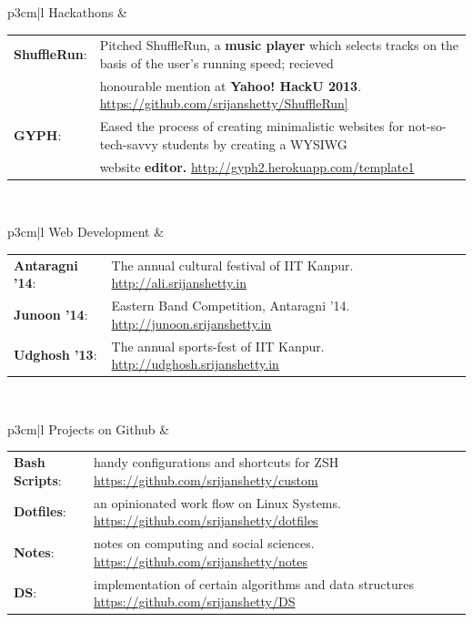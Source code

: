 \documentclass[a4paper]{article} %
\newcommand{\projectlist}[2]{
    \vspace{0.2cm}
    \begin{tabular}{p{3cm}|l}
        \textcolor{NavyBlue}{\small #1} & \footnotesize{#2}\\
    \end{tabular}
}
\begin{document}
\projectlist
    {Hackathons}
    {
        \begin{tabular}{p{2cm}l}
            \textbf{ShuffleRun}:
            & Pitched ShuffleRun, a \textbf{music player} which selects tracks on the basis of the user's
            running speed; recieved \\
            & honourable mention at \textbf{Yahoo! HackU 2013}.
            \href{https://github.com/srijanshetty/ShuffleRun} {https://github.com/srijanshetty/ShuffleRun]}\\

            \textbf{GYPH}:
            & Eased the process of creating minimalistic websites for not-so-tech-savvy students
            by creating a WYSIWG \\
            & website \textbf{editor.} \href{http://gyph2.herokuapp.com/template1} {http://gyph2.herokuapp.com/template1}
         \end{tabular}
     }

\projectlist
    {Web Development}
    {
        \begin{tabular}{p{2cm}l}
             \textbf{Antaragni '14}: & The annual cultural festival of IIT Kanpur.
             \href{http://ali.srijanshetty.in} {http://ali.srijanshetty.in}\\
             \textbf{Junoon '14}: & Eastern Band Competition, Antaragni '14.
             \href{http://junoon.srijanshetty.in}{http://junoon.srijanshetty.in}\\
            \textbf{Udghosh '13}: & The annual sports-fest of IIT Kanpur.
             \href{http://udghosh.srijanshetty.in}{http://udghosh.srijanshetty.in}\\
         \end{tabular}
    }

\projectlist
    {Projects on Github}
    {
        \begin{tabular}{p{2cm}l}
             \textbf{Bash Scripts}: & handy configurations and shortcuts for ZSH
             \href{https://github.com/srijanshetty/custom} {https://github.com/srijanshetty/custom}\\
             \textbf{Dotfiles}: & an opinionated work flow on Linux Systems.
             \href{https://github.com/srijanshetty/dotfiles} {https://github.com/srijanshetty/dotfiles}\\
             \textbf{Notes}: & notes on computing and social sciences.
             \href{https://github.com/srijanshetty/notes} {https://github.com/srijanshetty/notes}\\
             \textbf{DS}: & implementation of certain algorithms and data structures
             \href{https://github.com/srijanshetty/DS} {https://github.com/srijanshetty/DS}\\
         \end{tabular}
    }
\end{document}

